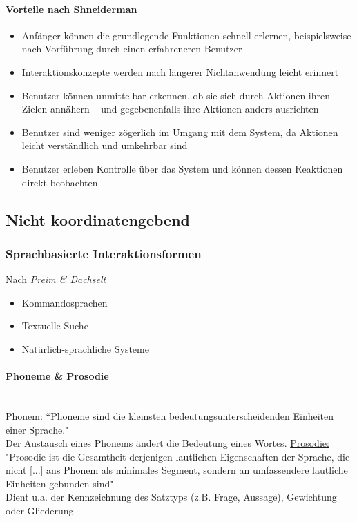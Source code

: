 \documentclass[8pt,a4paper,landscape]{extarticle}
\begin{document}
\begin{multicols*}{4}
	\paragraph{Vorteile nach Shneiderman}
	\begin{itemize}
		\item Anfänger können die grundlegende Funktionen schnell erlernen,
		      beispielsweise nach Vorführung durch einen erfahreneren Benutzer
		\item Interaktionskonzepte werden nach längerer Nichtanwendung leicht
		      erinnert
		\item Benutzer können unmittelbar erkennen, ob sie sich durch Aktionen
		      ihren Zielen annähern – und gegebenenfalls ihre Aktionen anders
		      ausrichten
		\item Benutzer sind weniger zögerlich im Umgang mit dem System, da
		      Aktionen leicht verständlich und umkehrbar sind
		\item Benutzer erleben Kontrolle über das System und können dessen
		      Reaktionen direkt beobachten
	\end{itemize}
	\subsection{Nicht koordinatengebend}
	\subsubsection{Sprachbasierte Interaktionsformen}
	Nach \emph{Preim \& Dachselt}
	\begin{itemize}
		\item Kommandosprachen
		\item Textuelle Suche
		\item Natürlich-sprachliche Systeme
	\end{itemize}
	\paragraph{Phoneme \& Prosodie}\mbox{}\\
	\underline{Phonem:} “Phoneme sind die kleinsten bedeutungsunterscheidenden
	Einheiten einer Sprache." \\ Der Austausch eines Phonems ändert die Bedeutung
	eines Wortes.
	\underline{Prosodie:} "Prosodie ist die Gesamtheit derjenigen lautlichen
	Eigenschaften der Sprache, die nicht [...] ans Phonem als minimales Segment,
	sondern an umfassendere lautliche Einheiten gebunden sind" \\ Dient u.a. der
	Kennzeichnung des Satztyps (z.B. Frage, Aussage), Gewichtung oder Gliederung.

\end{multicols*}
\end{document}
